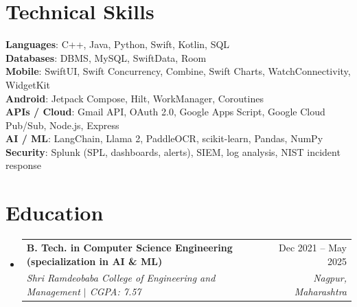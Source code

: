 \documentclass[a4paper,11pt]{article}
\makeatletter
\newcommand{\resumeSubheading}[4]{
  \vspace{-1pt}\item
    \begin{tabularx}{0.97\textwidth}[t]{@{}>{\raggedright\arraybackslash}X@{\hspace{0.75em}}r@{}}
      \textbf{#1} & #2 \\
      \textit{\small#3} & \textit{\small #4} \\
    \end{tabularx}\vspace{-3pt}
}
\newcommand{\resumeSubItemListStart}{\begin{itemize}[leftmargin=0.15in, label={}]}
\newcommand{\resumeSubItemListEnd}{\end{itemize}}
\makeatother
\begin{document}
\section{Technical Skills}
  \begin{itemize}[leftmargin=0.15in, label={}]
    \small{\item{
      \textbf{Languages}{: C++, Java, Python, Swift, Kotlin, SQL} \\
      \textbf{Databases}{: DBMS, MySQL, SwiftData, Room} \\
      \textbf{Mobile}{: SwiftUI, Swift Concurrency, Combine, Swift Charts, WatchConnectivity, WidgetKit} \\
      \textbf{Android}{: Jetpack Compose, Hilt, WorkManager, Coroutines} \\
      \textbf{APIs / Cloud}{: Gmail API, OAuth 2.0, Google Apps Script, Google Cloud Pub/Sub, Node.js, Express} \\
      \textbf{AI / ML}{: LangChain, Llama 2, PaddleOCR, scikit-learn, Pandas, NumPy} \\
      \textbf{Security}{: Splunk (SPL, dashboards, alerts), SIEM, log analysis, NIST incident response}
    }}
  \end{itemize}

\section{Education}
  \resumeSubItemListStart
    \resumeSubheading
      {B. Tech. in Computer Science Engineering (specialization in AI \& ML)}{Dec 2021 -- May 2025}
      {Shri Ramdeobaba College of Engineering and Management $|$ CGPA: 7.57}{Nagpur, Maharashtra}
  \resumeSubItemListEnd
\end{document}
